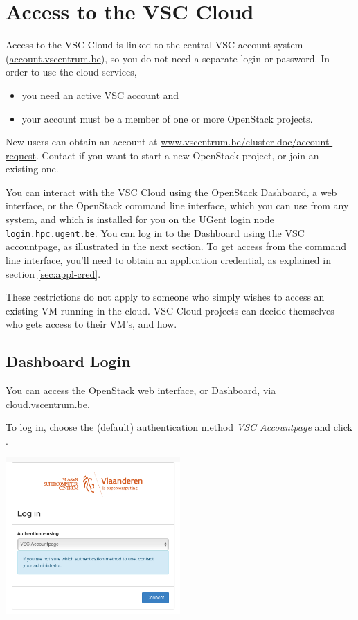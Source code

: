 \chapter{Access to the VSC Cloud}
Access to the VSC Cloud is linked to the central VSC account system
(\href{https://account.vscentrum.be}{account.vscentrum.be}), so you do
not need a separate login or password.  In order to use the cloud
services,
\begin{itemize}
\item you need an active VSC account and
\item your account must be a member of one or more OpenStack projects.
\end{itemize}
New users can obtain an account at
\href{https://www.vscentrum.be/cluster-doc/account-request}{www.vscentrum.be/cluster-doc/account-request}.
Contact \cloudinfo if you want to start a new OpenStack project, or
join an existing one.

You can interact with the VSC Cloud using the OpenStack Dashboard, a
web interface, or the OpenStack command line interface, which you can
use from any system, and which is installed for you on the UGent login
node \lstinline{login.hpc.ugent.be}.  You can log in to the Dashboard
using the VSC accountpage, as illustrated in the next section.  To get
access from the command line interface, you'll need to obtain an
application credential, as explained in section \ref{sec:appl-cred}.

These restrictions do not apply to someone who simply wishes to access
an existing VM running in the cloud.  VSC Cloud projects can decide
themselves who gets access to their VM's, and how.

\section{Dashboard Login}\label{sec:dashboard-login}
You can access the OpenStack web interface, or Dashboard, via \href{https://cloud.vscentrum.be}{cloud.vscentrum.be}.

To log in, choose the (default) authentication method \emph{VSC Accountpage} and click .
\begin{center}
\includegraphics[width=0.5\textwidth]{img/cloud_login_1.png}
\end{center}

